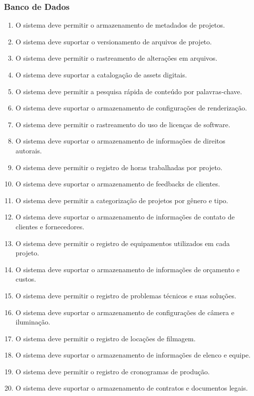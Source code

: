 \subsubsection{Banco de Dados}
\begin{enumerate}
  \item O sistema deve permitir o armazenamento de metadados de projetos.
  \item O sistema deve suportar o versionamento de arquivos de projeto.
  \item O sistema deve permitir o rastreamento de alterações em arquivos.
  \item O sistema deve suportar a catalogação de assets digitais.
  \item O sistema deve permitir a pesquisa rápida de conteúdo por palavras-chave.
  \item O sistema deve suportar o armazenamento de configurações de renderização.
  \item O sistema deve permitir o rastreamento do uso de licenças de software.
  \item O sistema deve suportar o armazenamento de informações de direitos autorais.
  \item O sistema deve permitir o registro de horas trabalhadas por projeto.
  \item O sistema deve suportar o armazenamento de feedbacks de clientes.
  \item O sistema deve permitir a categorização de projetos por gênero e tipo.
  \item O sistema deve suportar o armazenamento de informações de contato de clientes e fornecedores.
  \item O sistema deve permitir o registro de equipamentos utilizados em cada projeto.
  \item O sistema deve suportar o armazenamento de informações de orçamento e custos.
  \item O sistema deve permitir o registro de problemas técnicos e suas soluções.
  \item O sistema deve suportar o armazenamento de configurações de câmera e iluminação.
  \item O sistema deve permitir o registro de locações de filmagem.
  \item O sistema deve suportar o armazenamento de informações de elenco e equipe.
  \item O sistema deve permitir o registro de cronogramas de produção.
  \item O sistema deve suportar o armazenamento de contratos e documentos legais.
\end{enumerate}

